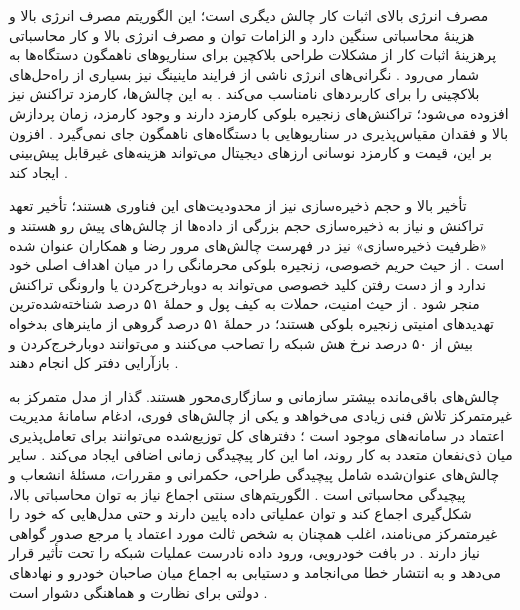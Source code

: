 مصرف انرژی بالای اثبات کار چالش دیگری است؛ این الگوریتم مصرف انرژی بالا و هزینهٔ محاسباتی سنگین دارد \cite{razaBlockchainBasedReputationTrust2024} و الزامات توان و مصرف انرژی بالا و کار محاسباتی پرهزینهٔ اثبات کار از مشکلات طراحی بلاکچین برای سناریوهای ناهمگون دستگاه‌ها به شمار می‌رود \cite{silvanoIotaTangleCryptocurrency2020}. نگرانی‌های انرژی ناشی از فرایند ماینینگ نیز بسیاری از راه‌حل‌های بلاکچینی را برای کاربردهای  نامناسب می‌کند \cite{sealeyIOTATangle202022}. به این چالش‌ها، کارمزد تراکنش نیز افزوده می‌شود؛ تراکنش‌های زنجیره بلوکی کارمزد دارند \cite{IOTATANGLE20, silvanoIotaTangleCryptocurrency2020} و وجود کارمزد، زمان پردازش بالا و فقدان مقیاس‌پذیری در سناریوهایی با دستگاه‌های ناهمگون جای نمی‌گیرد \cite{silvanoIotaTangleCryptocurrency2020}. افزون بر این، قیمت و کارمزد نوسانی ارزهای دیجیتال می‌تواند هزینه‌های غیرقابل پیش‌بینی ایجاد کند \cite{silvanoIotaTangleCryptocurrency2020}.

تأخیر بالا و حجم ذخیره‌سازی نیز از محدودیت‌های این فناوری هستند؛ تأخیر تعهد تراکنش و نیاز به ذخیره‌سازی حجم بزرگی از داده‌ها از چالش‌های پیش رو هستند \cite{silvanoIotaTangleCryptocurrency2020} و «ظرفیت ذخیره‌سازی» نیز در فهرست چالش‌های مرور رضا و همکاران عنوان شده است \cite{razaBlockchainBasedReputationTrust2024}. از حیث حریم خصوصی، زنجیره بلوکی محرمانگی را در میان اهداف اصلی خود ندارد و از دست رفتن کلید خصوصی می‌تواند به دوبارخرج‌کردن یا وارونگی تراکنش منجر شود \cite{razaBlockchainBasedReputationTrust2024}. از حیث امنیت، حملات به کیف پول و حملهٔ ۵۱ درصد شناخته‌شده‌ترین تهدیدهای امنیتی زنجیره بلوکی هستند؛ در حملهٔ ۵۱ درصد گروهی از ماینرهای بدخواه بیش از ۵۰ درصد نرخ هش شبکه را تصاحب می‌کنند و می‌توانند دوبارخرج‌کردن و بازآرایی دفتر کل انجام دهند \cite{razaBlockchainBasedReputationTrust2024}.

چالش‌های باقی‌مانده بیشتر سازمانی و سازگاری‌محور هستند. گذار از مدل متمرکز به غیرمتمرکز تلاش فنی زیادی می‌خواهد و یکی از چالش‌های فوری، ادغام سامانهٔ مدیریت اعتماد در سامانه‌های موجود است \cite{razaBlockchainBasedReputationTrust2024}؛ دفترهای کل توزیع‌شده می‌توانند برای تعامل‌پذیری میان ذی‌نفعان متعدد به کار روند، اما این کار پیچیدگی زمانی اضافی ایجاد می‌کند \cite{farsimadanReviewSecurityChallenges2025}. سایر چالش‌های عنوان‌شده شامل پیچیدگی طراحی، حکمرانی و مقررات، مسئلهٔ انشعاب و پیچیدگی محاسباتی است \cite{razaBlockchainBasedReputationTrust2024}. الگوریتم‌های سنتی اجماع نیاز به توان محاسباتی بالا، شکل‌گیری اجماع کند و توان عملیاتی داده پایین دارند \cite{razaBlockchainBasedReputationTrust2024} و حتی مدل‌هایی که خود را غیرمتمرکز می‌نامند، اغلب همچنان به شخص ثالث مورد اعتماد یا مرجع صدور گواهی نیاز دارند \cite{razaBlockchainBasedReputationTrust2024}. در بافت خودرویی، ورود داده نادرست عملیات شبکه را تحت تأثیر قرار می‌دهد و به انتشار خطا می‌انجامد \cite{razaBlockchainBasedReputationTrust2024} و دستیابی به اجماع میان صاحبان خودرو و نهادهای دولتی برای نظارت و هماهنگی دشوار است \cite{razaBlockchainBasedReputationTrust2024}.

